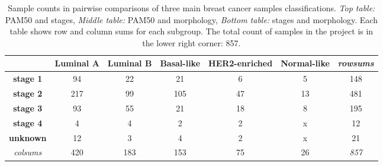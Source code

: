         
                \begin{table}[!h]
                \centering
               \scriptsize
                \caption[Count of samples in pairwise combinations of classification subgroup in the dataset]{Sample counts in pairwise comparisons of three main breast cancer samples classifications. \textit{Top table:} PAM50 and stages,\textit{ Middle table:} PAM50 and morphology, \textit{Bottom table:} stages and morphology. Each table shows row and column sums for each subgroup. The total count of samples in the project is in the lower right corner: 857.}
                \label{table:counts}      
                \begin{tabular}{ccccccc}
                \multicolumn{1}{l|}{} & \multicolumn{1}{c|}{\textbf{Luminal A}} & \multicolumn{1}{c|}{\textbf{Luminal B}} & \multicolumn{1}{c|}{\textbf{Basal-like}} & \multicolumn{1}{c|}{\textbf{HER2-enriched}} & \multicolumn{1}{c|}{\textbf{Normal-like}} & {\color[HTML]{9B9B9B} \textit{rowsums}} \\ \hline
                \multicolumn{1}{c|}{\textbf{stage 1}} & \multicolumn{1}{c|}{94} & \multicolumn{1}{c|}{22} & \multicolumn{1}{c|}{21} & \multicolumn{1}{c|}{6} & \multicolumn{1}{c|}{5} & \multicolumn{1}{c|}{{\color[HTML]{656565} 148}} \\ \hline
                \multicolumn{1}{c|}{\textbf{stage 2}} & \multicolumn{1}{c|}{217} & \multicolumn{1}{c|}{99} & \multicolumn{1}{c|}{105} & \multicolumn{1}{c|}{47} & \multicolumn{1}{c|}{13} & \multicolumn{1}{c|}{{\color[HTML]{656565} 481}} \\ \hline
                \multicolumn{1}{c|}{\textbf{stage 3}} & \multicolumn{1}{c|}{93} & \multicolumn{1}{c|}{55} & \multicolumn{1}{c|}{21} & \multicolumn{1}{c|}{18} & \multicolumn{1}{c|}{8} & \multicolumn{1}{c|}{{\color[HTML]{656565} 195}} \\ \hline
                \multicolumn{1}{c|}{\textbf{stage 4}} & \multicolumn{1}{c|}{4} & \multicolumn{1}{c|}{4} & \multicolumn{1}{c|}{2} & \multicolumn{1}{c|}{2} & \multicolumn{1}{c|}{{\color[HTML]{656565} x}} & \multicolumn{1}{c|}{{\color[HTML]{656565} 12}} \\ \hline
                \multicolumn{1}{c|}{\textbf{unknown}} & \multicolumn{1}{c|}{12} & \multicolumn{1}{c|}{3} & \multicolumn{1}{c|}{4} & \multicolumn{1}{c|}{2} & \multicolumn{1}{c|}{{\color[HTML]{656565} x}} & \multicolumn{1}{c|}{{\color[HTML]{656565} 21}} \\ \hline
                \multicolumn{1}{c|}{{\color[HTML]{9B9B9B} \textit{colsums}}} & \multicolumn{1}{c|}{{\color[HTML]{656565} 420}} & \multicolumn{1}{c|}{{\color[HTML]{656565} 183}} & \multicolumn{1}{c|}{{\color[HTML]{656565} 153}} & \multicolumn{1}{c|}{{\color[HTML]{656565} 75}} & \multicolumn{1}{c|}{{\color[HTML]{656565} 26}} & \multicolumn{1}{c|}{\textit{857}} \\ \cline{2-7} 

\end{tabular}
\end{table}
